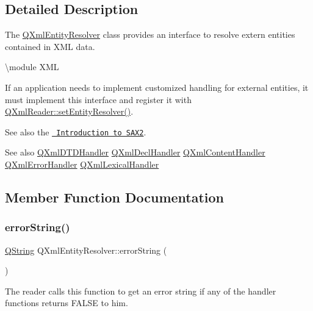 \subsection{Detailed Description}
The \mbox{\hyperlink{class_q_xml_entity_resolver}{Q\+Xml\+Entity\+Resolver}} class provides an interface to resolve extern entities contained in X\+ML data. 

\textbackslash{}module X\+ML

If an application needs to implement customized handling for external entities, it must implement this interface and register it with \mbox{\hyperlink{class_q_xml_reader_a82a810f10ac48cf35d698f57bc2d4647}{Q\+Xml\+Reader\+::set\+Entity\+Resolver()}}.

See also the \href{xml.html\#introSAX2}{\texttt{ Introduction to S\+A\+X2}}.

\begin{DoxySeeAlso}{See also}
\mbox{\hyperlink{class_q_xml_d_t_d_handler}{Q\+Xml\+D\+T\+D\+Handler}} \mbox{\hyperlink{class_q_xml_decl_handler}{Q\+Xml\+Decl\+Handler}} \mbox{\hyperlink{class_q_xml_content_handler}{Q\+Xml\+Content\+Handler}} \mbox{\hyperlink{class_q_xml_error_handler}{Q\+Xml\+Error\+Handler}} \mbox{\hyperlink{class_q_xml_lexical_handler}{Q\+Xml\+Lexical\+Handler}} 
\end{DoxySeeAlso}


\subsection{Member Function Documentation}
\mbox{\label{class_q_xml_entity_resolver_a3f190a7cd80a8faa3df903f963709370}} 
\subsubsection{\texorpdfstring{errorString()}{errorString()}}
{\footnotesize\ttfamily \mbox{\hyperlink{class_q_string}{Q\+String}} Q\+Xml\+Entity\+Resolver\+::error\+String (\begin{DoxyParamCaption}{ }\end{DoxyParamCaption})\hspace{0.3cm}{\ttfamily [pure virtual]}}

The reader calls this function to get an error string if any of the handler functions returns F\+A\+L\+SE to him. 

